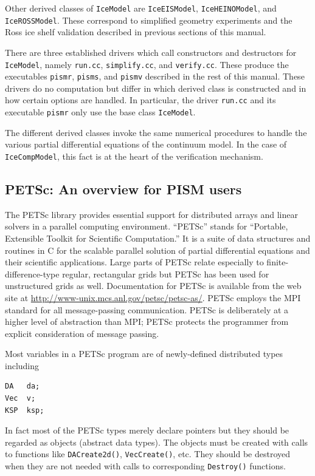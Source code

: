\documentclass[11pt,final]{amsart}
\renewcommand{\t}[1]{\texttt{#1}}
\begin{document}
Other derived classes of \t{IceModel} are \t{IceEISModel}, \t{IceHEINOModel}, and \t{IceROSSModel}.  These correspond to simplified geometry experiments and the Ross ice shelf validation described in previous sections of this manual.

There are three established drivers which call constructors and destructors for \t{IceModel}, namely \verb|run.cc|, \verb|simplify.cc|, and \verb|verify.cc|.  These produce the executables \verb|pismr|, \verb|pisms|, and \verb|pismv| described in the rest of this manual.  These drivers do no computation but differ in which derived class is constructed and in how certain options are handled.  In particular, the driver \verb|run.cc| and its executable \verb|pismr| only use the base class \verb|IceModel|.

The different derived classes invoke the same numerical procedures to handle the various partial differential equations of the continuum model.  In the case of \t{IceCompModel}, this fact is at the heart of the verification mechanism.  

\subsection{PETSc: An overview for PISM users}  The PETSc library \cite{petsc-user-ref,petsc-efficient} provides essential support for distributed arrays and linear solvers in a parallel computing environment.  ``PETSc'' stands for ``Portable, Extensible Toolkit for Scientific Computation.''  It is a suite of data structures and routines in C for the scalable parallel solution of partial differential equations and their scientific applications.  Large parts of PETSc relate especially to finite-difference-type regular, rectangular grids but PETSc has been used for unstructured grids as well.  Documentation for PETSc is available from the web site at \url{http://www-unix.mcs.anl.gov/petsc/petsc-as/}.  PETSc employs the MPI standard for all message-passing communication.  PETSc is deliberately at a higher level of abstraction than MPI; PETSc protects the programmer from explicit consideration of message passing.

Most variables in a PETSc program are of newly-defined distributed types including
\begin{verbatim}
DA   da;
Vec  v;
KSP  ksp;
\end{verbatim}
In fact most of the PETSc types merely declare pointers but they should be regarded as objects (abstract data types).  The objects must be created with calls to functions like \t{DACreate2d()}, \t{VecCreate()}, etc.  They should be destroyed when they are not needed with calls to corresponding \t{Destroy()} functions.
\end{document}
